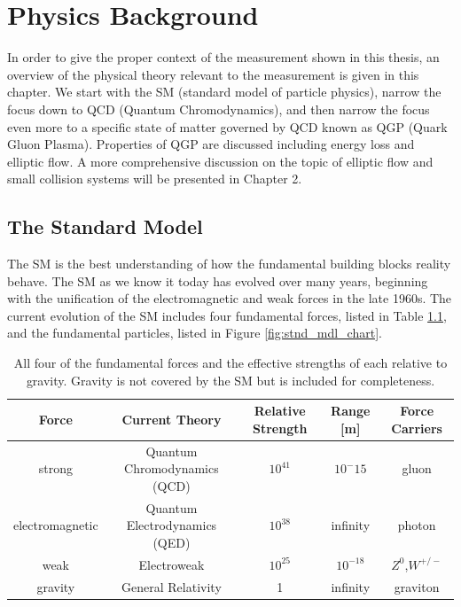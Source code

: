 \chapter{Physics Background}
In order to give the proper context of the measurement shown in this thesis,  an overview of the physical theory relevant to the measurement is given in this chapter. We start with the SM (standard model of particle physics), narrow the focus down to QCD (Quantum Chromodynamics), and then narrow the focus even more to a specific state of matter governed by QCD known as QGP (Quark Gluon Plasma). Properties of QGP are discussed including energy loss and elliptic flow. A more comprehensive discussion on the topic of elliptic flow and small collision systems will be presented in Chapter 2.
\section{The Standard Model}
The SM is the best understanding of how the fundamental building blocks reality behave. The SM as we know it today has evolved over many years, beginning with the unification of the electromagnetic and weak forces in the late 1960s. The current evolution of the SM includes four fundamental forces, listed in Table \ref{tbl:sm}, and the fundamental particles, listed in Figure \ref{fig:stnd_mdl_chart}.
\begin{table}[h!]
\caption{All four of the fundamental forces and the effective strengths of each relative to gravity. Gravity is not covered by the SM but is included for completeness.}
\begin{center}
    \begin{tabular}{ccccc}
    \hline
    Force &Current Theory  & Relative Strength & Range [m] &  Force Carriers\\ \hline
    strong  & Quantum Chromodynamics (QCD) & $10^{41}$ & $10^-{15}$&  gluon\\
    electromagnetic &Quantum Electrodynamics (QED) & $10^{38}$ & infinity &  photon\\
    weak & Electroweak & $10^{25}$ &  $10^{-18}$ & $Z^0$,$W^{+/-}$\\
    gravity & General Relativity & 1 & infinity & graviton\\ \hline
    \end{tabular}
\end{center}
\label{tbl:sm}
\end{table}

